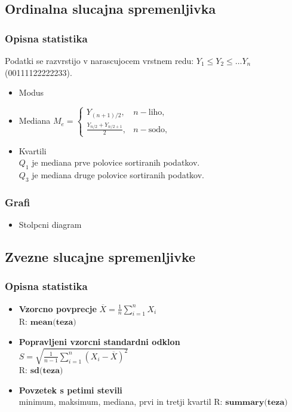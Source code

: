\subsection{Ordinalna slucajna spremenljivka}
\subsubsection{Opisna statistika}
Podatki se razvrstijo v narascujocem vrstnem redu: $Y_1\leq Y_2\leq \dots Y_n$ (00111122222233).
\begin{itemize}
    \item Modus
    \item Mediana $\displaystyle M_e=\left\{\begin{array}{ll} 
        Y_{(n+1)/2},	&	n-\text{liho}, \\
        \frac{Y_{n/2}+Y_{n/2+1}}{2}, & n-\text{sodo},
    \end{array}\right.$
    \item Kvartili 
    \\ $Q_1$ je mediana prve polovice sortiranih podatkov.
    \\$Q_3$ je mediana druge polovice sortiranih podatkov.
\end{itemize}
\subsubsection{Grafi}
\begin{itemize}
    \item Stolpcni diagram
\end{itemize}


\subsection{Zvezne slucajne spremenljivke}
\subsubsection{Opisna statistika}
\begin{itemize}[leftmargin=*]
    \item \textbf{Vzorcno povprecje} $\overline{X}=\frac{1}{n}\sum\limits_{i=1}^n X_i$\\
    R: $\textbf{mean(teza)}$
    \item \textbf{Popravljeni vzorcni standardni odklon}\\ $S=\sqrt{\frac{1}{n-1}\sum\limits^n_{i=1} (X_i-\overline{X})^2}$\\
    R: $\textbf{sd(teza)}$
    \item \textbf{Povzetek s petimi stevili}\\
    minimum, maksimum, mediana, prvi in tretji kvartil
    R: $\textbf{summary(teza)}$
    
\end{itemize}
